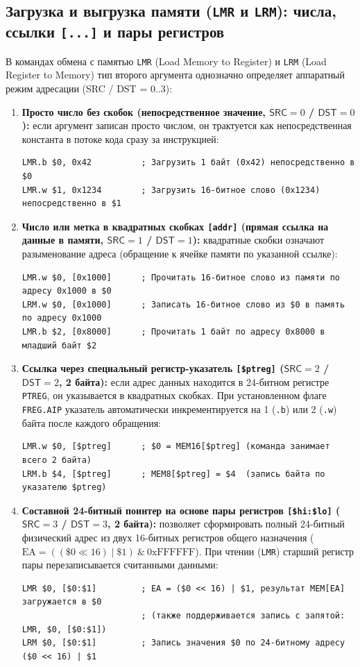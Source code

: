 \documentclass[11pt,a4paper]{article}
\newcommand{\reg}[1]{\texttt{#1}}
\newcommand{\field}[1]{\textsf{#1}}
\begin{document}
\subsection{Загрузка и выгрузка памяти (\texttt{LMR} и \texttt{LRM}): числа, ссылки \texttt{[...]} и пары регистров}
В командах обмена с памятью \texttt{LMR} (Load Memory to Register) и \texttt{LRM} (Load Register to Memory) тип второго аргумента однозначно определяет аппаратный режим адресации (\field{SRC} / \field{DST} = 0..3):
\begin{enumerate}
  \item \textbf{Просто число без скобок (непосредственное значение, $\field{SRC}=0$ / $\field{DST}=0$):} если аргумент записан просто числом, он трактуется как непосредственная константа в потоке кода сразу за инструкцией:
\begin{verbatim}
LMR.b $0, 0x42          ; Загрузить 1 байт (0x42) непосредственно в $0
LMR.w $1, 0x1234        ; Загрузить 16-битное слово (0x1234) непосредственно в $1
\end{verbatim}
  \item \textbf{Число или метка в квадратных скобках \texttt{[addr]} (прямая ссылка на данные в памяти, $\field{SRC}=1$ / $\field{DST}=1$):} квадратные скобки означают разыменование адреса (обращение к ячейке памяти по указанной ссылке):
\begin{verbatim}
LMR.w $0, [0x1000]      ; Прочитать 16-битное слово из памяти по адресу 0x1000 в $0
LRM.w $0, [0x1000]      ; Записать 16-битное слово из $0 в память по адресу 0x1000
LMR.b $2, [0x8000]      ; Прочитать 1 байт по адресу 0x8000 в младший байт $2
\end{verbatim}
  \item \textbf{Ссылка через специальный регистр-указатель \texttt{[\$ptreg]} ($\field{SRC}=2$ / $\field{DST}=2$, 2 байта):} если адрес данных находится в 24-битном регистре \reg{PTREG}, он указывается в квадратных скобках. При установленном флаге \reg{FREG.AIP} указатель автоматически инкрементируется на 1 (\texttt{.b}) или 2 (\texttt{.w}) байта после каждого обращения:
\begin{verbatim}
LMR.w $0, [$ptreg]      ; $0 = MEM16[$ptreg] (команда занимает всего 2 байта)
LRM.b $4, [$ptreg]      ; MEM8[$ptreg] = $4  (запись байта по указателю $ptreg)
\end{verbatim}
  \item \textbf{Составной 24-битный поинтер на основе пары регистров \texttt{[\$hi:\$lo]} ($\field{SRC}=3$ / $\field{DST}=3$, 2 байта):} позволяет сформировать полный 24-битный физический адрес из двух 16-битных регистров общего назначения ($\text{EA} = ((\$0 \ll 16) \mid \$1) \ \& \ \text{0xFFFFFF}$). При чтении (\texttt{LMR}) старший регистр пары перезаписывается считанными данными:
\begin{verbatim}
LMR $0, [$0:$1]         ; EA = ($0 << 16) | $1, результат MEM[EA] загружается в $0
                        ; (также поддерживается запись с запятой: LMR, $0, [$0:$1])
LRM $0, [$0:$1]         ; Запись значения $0 по 24-битному адресу ($0 << 16) | $1
\end{verbatim}
\end{enumerate}
\end{document}

